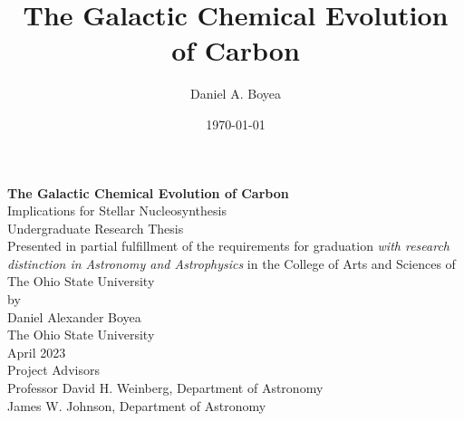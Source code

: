 \documentclass[12pt,oneside,letterpaper]{report}
\title{The Galactic Chemical Evolution of Carbon}
\author{Daniel A. Boyea}
\date{\today}
\begin{document}


\begin{titlepage}
   \begin{center}
       \textbf{The Galactic Chemical Evolution of Carbon}\\
       Implications for Stellar Nucleosynthesis\\
       \vspace*{3\baselineskip}
        Undergraduate Research Thesis\\
       \vspace*{3\baselineskip}
    Presented in partial fulfillment of the requirements for graduation \textit{with research distinction in Astronomy and Astrophysics} in the College of Arts and Sciences of The Ohio State University\\
       \vspace*{3\baselineskip}
        by\\
       \vspace*{3\baselineskip}
       {Daniel Alexander Boyea}\\
       \vspace*{3\baselineskip}
       The Ohio State University\\
       April 2023\\
       \vspace*{3\baselineskip}
       Project Advisors\\
       Professor David H. Weinberg, Department of Astronomy \\
       James W. Johnson, Department of Astronomy
       \vfill
   \end{center}
\end{titlepage}



\end{document}
